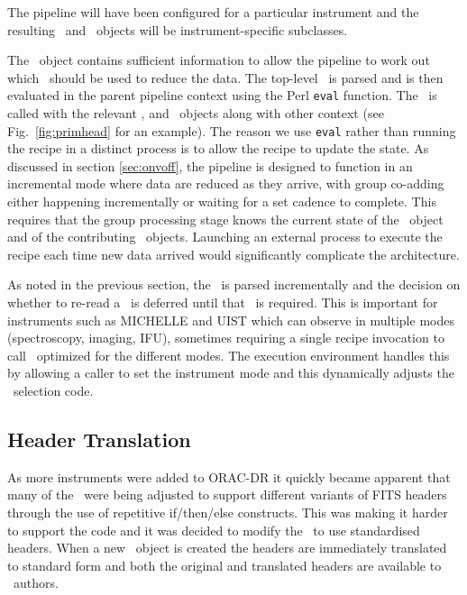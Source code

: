 \documentclass[final,authoryear,5p,times,twocolumn]{elsarticle}
\begin{document}
The pipeline will have been configured for a particular instrument and
the resulting \Frame\ and \Group\ objects will be instrument-specific subclasses.

The \Frame\ object contains sufficient information to allow the
pipeline to work out which \recipe\ should be used to reduce the
data. The top-level \recipe\ is parsed and is then evaluated in the
parent pipeline context using the Perl \texttt{eval} function. The
\recipe\ is called with the relevant \Frame, and \Group\ objects along
with other context (see Fig.\ \ref{fig:primhead} for an example). The
reason we use \texttt{eval} rather than running the recipe in a
distinct process is to allow the recipe to update the state. As
discussed in section \ref{sec:onvoff}, the pipeline is designed to
function in an incremental mode where data are reduced as they arrive,
with group co-adding either happening incrementally or waiting for a
set cadence to complete. This requires that the group processing stage
knows the current state of the \Group\ object and of the contributing
\Frame\ objects. Launching an external process to execute the
recipe each time new data arrived would significantly complicate the
architecture.

As noted in the previous section, the \recipe\ is parsed incrementally
and the decision on whether to re-read a \primitive\ is deferred until
that \primitive\ is required. This is important for instruments such
as MICHELLE and UIST which can observe in multiple modes
(spectroscopy, imaging, IFU), sometimes
requiring a single recipe invocation to call \primitives\ optimized
for the different modes. The execution environment handles this by
allowing a caller to set the instrument mode and this dynamically
adjusts the \primitive\ selection code.

\subsection{Header Translation}

As more instruments were added to ORAC-DR it quickly became apparent
that many of the \primitives\ were being adjusted to support different
variants of FITS headers through the use of repetitive if/then/else
constructs. This was making it harder to support the code and it was
decided to modify the \primitives\ to use standardised headers. When a
new \Frame\ object is created the headers are immediately translated
to standard form and both the original and translated headers are
available to \primitive\ authors.
\end{document}
